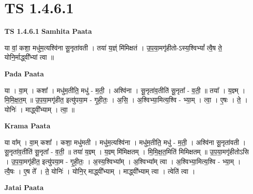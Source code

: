 \documentclass[17pt]{extarticle}
\begin{document}
\section*{ TS 1.4.6.1 }

\textbf{TS 1.4.6.1 } \newline
\textbf{Samhita Paata} \newline

या वां॒ कशा॒ मधु॑म॒त्यश्वि॑ना सू॒नृता॑वती । तया॑ य॒ज्ञ्ं मि॑मिक्षतं । उ॒प॒या॒मगृ॑हीतो-ऽस्य॒श्विभ्यां᳚ त्वै॒ष ते॒ योनि॒र्माद्ध्वी᳚भ्यां त्वा ॥ \newline

\textbf{Pada Paata} \newline

या । वा॒म् । कशा᳚ । मधु॑म॒तीति॒ मधु॑ - म॒ती॒ । अश्वि॑ना । सू॒नृता॑व॒तीति॑ सू॒नृता᳚ - व॒ती॒ ॥ तया᳚ । य॒ज्ञ्म् । मि॒मि॒क्ष॒त॒म् ॥ उ॒प॒या॒मगृ॑हीत॒ इत्यु॑पया॒म - गृ॒ही॒तः॒ । अ॒सि॒ । अ॒श्विभ्या॒मित्य॒श्वि - भ्या॒म् । त्वा॒ । ए॒षः । ते॒ । योनिः॑ । माद्ध्वी᳚भ्याम् । त्वा॒ ॥  \newline


\textbf{Krama Paata} \newline

या वा᳚म् । वा॒म् कशा᳚ । कशा॒ मधु॑मती । मधु॑म॒त्यश्वि॑ना । मधु॑म॒तीति॒ मधु॑ - म॒ती॒ । अश्वि॑ना सू॒नृता॑वती । सू॒नृता॑व॒तीति॑ सू॒नृता᳚ - व॒ती॒ ॥ तया॑ य॒ज्ञ्म् । य॒ज्ञ्म् मि॑मिक्षतम् । मि॒मि॒क्ष॒त॒मिति॑ मिमिक्षतम् ॥ उ॒प॒या॒मगृ॑हीतोऽसि । उ॒प॒या॒मगृ॑हीत॒ इत्यु॑पया॒म - गृ॒ही॒तः॒ । अ॒स्य॒श्विभ्या᳚म् । अ॒श्विभ्या᳚म् त्वा । अ॒श्विभ्या॒मित्य॒श्वि - भ्या॒म् । त्वै॒षः । ए॒ष ते᳚ । ते॒ योनिः॑ । योनि॒र् माद्ध्वी᳚भ्याम् । माद्ध्वी᳚भ्याम् त्वा । त्वेति॑ त्वा । \newline

\textbf{Jatai Paata} \newline
\end{document}
